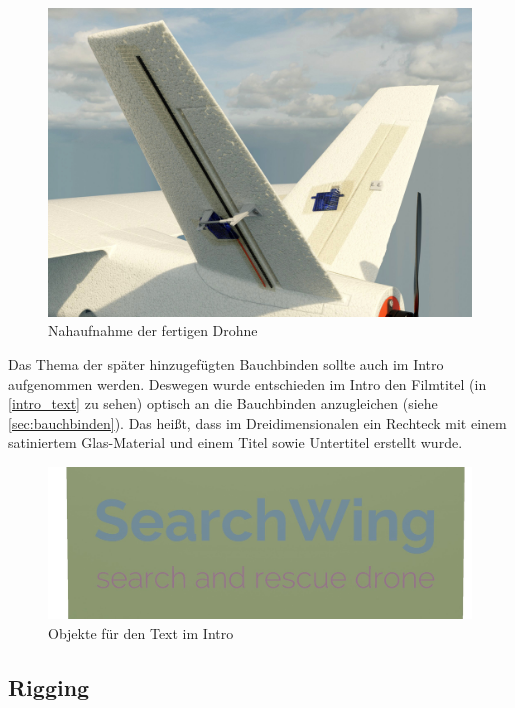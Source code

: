 \begin{figure}[H]
\begin{center}
\includegraphics[width=\textwidth]{gfx/prod/plane/shading.jpg}
\caption{Nahaufnahme der fertigen Drohne}
\label{shading}
\end{center}
\end{figure}
\noindent
Das Thema der später hinzugefügten Bauchbinden sollte auch im Intro aufgenommen werden. Deswegen wurde entschieden im Intro den Filmtitel (in \autoref{intro_text} zu sehen) optisch an die Bauchbinden anzugleichen (siehe \autoref{sec:bauchbinden}). Das heißt, dass im Dreidimensionalen ein Rechteck mit einem satiniertem Glas-Material und einem Titel sowie Untertitel erstellt wurde.

\begin{figure}[H]
\begin{center}
\includegraphics[width=\textwidth]{gfx/prod/env/intro_text.jpg}
\caption{Objekte für den Text im Intro}
\label{intro_text}
\end{center}
\end{figure}

\subsection{Rigging}

